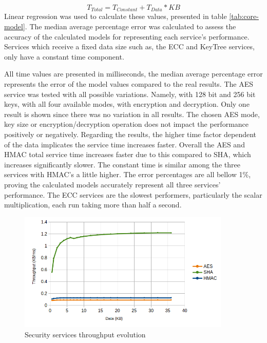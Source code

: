 \begin{equation}
	\label{eq:linear-eq}
	T_{Total} = T_{Constant} + T_{Data} * KB
\end{equation}
Linear regression was used to calculate these values, presented in table \ref{tab:core-model}. The median average percentage error was calculated to assess the accuracy of the calculated models for representing each service's performance. Services which receive a fixed data size such as, the \ac{ECC} and KeyTree services, only have a constant time component.



All time values are presented in milliseconds, the median average percentage error represents the error of the model values compared to the real results.
The \ac{AES} service was tested with all possible variations. Namely, with 128 bit and 256 bit keys, with all four available modes, with encryption and decryption. Only one result is shown since there was no variation in all results. The chosen \ac{AES} mode, key size or encryption/decryption operation does not impact the performance positively or negatively.
Regarding the results, the higher time factor dependent of the data implicates the service time increases faster. Overall the \ac{AES} and \ac{HMAC} total service time increases faster due to this compared to \ac{SHA}, which increases significantly slower. The constant time is similar among the three services with \ac{HMAC}'s a little higher.
The error percentages are all bellow 1\%, proving the calculated models accurately represent all three services' performance.
The \ac{ECC} services are the slowest performers, particularly the scalar multiplication, each run taking more than half a second.

\begin{figure}[h!]
	\centering
	\includegraphics[width=0.9\textwidth]{./Images/core-tput.png}
	\caption{Security services throughput evolution}
	\label{fig:performance:core-tput}
\end{figure}

